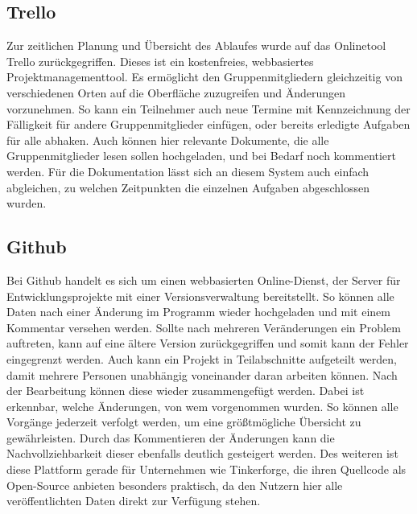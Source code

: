
\subsection{Trello}
Zur zeitlichen Planung und Übersicht des Ablaufes wurde auf das Onlinetool Trello zurückgegriffen. Dieses ist ein kostenfreies, webbasiertes Projektmanagementtool. Es ermöglicht den Gruppenmitgliedern gleichzeitig von verschiedenen Orten auf die Oberfläche zuzugreifen und Änderungen vorzunehmen. So kann ein Teilnehmer auch neue Termine mit Kennzeichnung der Fälligkeit für andere Gruppenmitglieder einfügen, oder bereits erledigte Aufgaben für alle abhaken. Auch können hier relevante Dokumente, die alle Gruppenmitglieder lesen sollen hochgeladen, und bei Bedarf noch kommentiert werden. Für die Dokumentation lässt sich an diesem System auch einfach abgleichen, zu welchen Zeitpunkten die einzelnen Aufgaben abgeschlossen wurden.

\subsection{Github}
Bei Github handelt es sich um einen webbasierten Online-Dienst, der Server für Entwicklungsprojekte mit einer Versionsverwaltung bereitstellt. So können alle Daten nach einer Änderung im Programm wieder hochgeladen und mit einem Kommentar versehen werden. Sollte nach mehreren Veränderungen ein Problem auftreten, kann auf eine ältere Version zurückgegriffen und somit kann der Fehler eingegrenzt werden. Auch kann ein Projekt in Teilabschnitte aufgeteilt werden, damit mehrere Personen unabhängig voneinander daran arbeiten können. Nach der Bearbeitung können diese wieder zusammengefügt werden. Dabei ist erkennbar, welche Änderungen, von wem vorgenommen wurden. So können alle Vorgänge jederzeit verfolgt werden, um eine größtmögliche Übersicht zu gewährleisten. Durch das Kommentieren der Änderungen kann die Nachvollziehbarkeit dieser ebenfalls deutlich gesteigert werden. Des weiteren ist diese Plattform gerade für Unternehmen wie Tinkerforge, die ihren Quellcode als Open-Source anbieten besonders praktisch, da den Nutzern hier alle veröffentlichten Daten direkt zur Verfügung stehen.